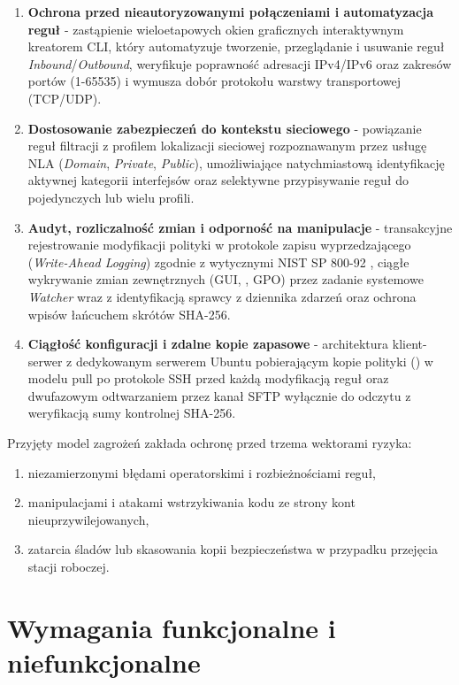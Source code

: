 \begin{enumerate}
    \item \textbf{Ochrona przed nieautoryzowanymi połączeniami i automatyzacja reguł} - zastąpienie wieloetapowych okien graficznych interaktywnym kreatorem CLI, który automatyzuje tworzenie, przeglądanie i usuwanie reguł \textit{Inbound}/\textit{Outbound}, weryfikuje poprawność adresacji IPv4/IPv6 oraz zakresów portów (1-65535) i wymusza dobór protokołu warstwy transportowej (TCP/UDP).
    \item \textbf{Dostosowanie zabezpieczeń do kontekstu sieciowego} - powiązanie reguł filtracji z profilem lokalizacji sieciowej rozpoznawanym przez usługę NLA (\textit{Domain}, \textit{Private}, \textit{Public}), umożliwiające natychmiastową identyfikację aktywnej kategorii interfejsów oraz selektywne przypisywanie reguł do pojedynczych lub wielu profili.
    \item \textbf{Audyt, rozliczalność zmian i odporność na manipulacje} - transakcyjne rejestrowanie modyfikacji polityki w protokole zapisu wyprzedzającego (\textit{Write-Ahead Logging}) zgodnie z wytycznymi NIST SP 800-92 \cite{nist-sp800-92}, ciągłe wykrywanie zmian zewnętrznych (GUI, , GPO) przez zadanie systemowe \textit{Watcher} wraz z identyfikacją sprawcy z dziennika zdarzeń oraz ochrona wpisów łańcuchem skrótów SHA-256.
    \item \textbf{Ciągłość konfiguracji i zdalne kopie zapasowe} - architektura klient-serwer z dedykowanym serwerem Ubuntu pobierającym kopie polityki () w modelu pull po protokole SSH przed każdą modyfikacją reguł oraz dwufazowym odtwarzaniem przez kanał SFTP wyłącznie do odczytu z weryfikacją sumy kontrolnej SHA-256.
\end{enumerate}

Przyjęty model zagrożeń zakłada ochronę przed trzema wektorami ryzyka: 
\begin{enumerate}
    \item niezamierzonymi błędami operatorskimi i rozbieżnościami reguł,
    \item manipulacjami i atakami wstrzykiwania kodu ze strony kont nieuprzywilejowanych,
    \item zatarcia śladów lub skasowania kopii bezpieczeństwa w przypadku przejęcia stacji roboczej.
\end{enumerate}

\section{Wymagania funkcjonalne i niefunkcjonalne}\label{sec:wymagania}

